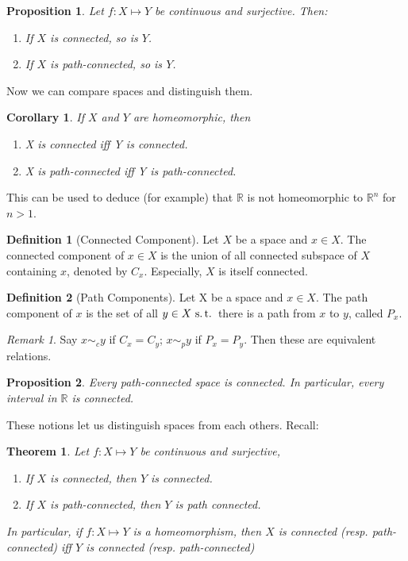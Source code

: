 \documentclass[12pt]{amsart}
\newcommand{\bbR}{\mathbb{R}}
\newcommand{\suchthat}{\operatorname{\thinspace s.t. \thinspace}}
\theoremstyle{plain}
\newtheorem*{prop}{Proposition}
\newtheorem*{thm}{Theorem}
\newtheorem*{cor}{Corollary}
\theoremstyle{remark}
\newtheorem*{rmk}{Remark}
\theoremstyle{definition}
\newtheorem*{define}{Definition}
\begin{document}
\begin{prop}
	Let $f: X \mapsto Y$ be continuous and surjective. Then:
	\begin{enumerate}[(1)]
		\item If $X$ is connected, so is $Y$.
		\item If $X$ is path-connected, so is $Y$.
	\end{enumerate}
\end{prop}

Now we can compare spaces and distinguish them.

\begin{cor}
	If $X$ and $Y$ are homeomorphic, then 
	\begin{enumerate}[(1)]
		\item X is connected iff Y is connected.
		\item X is path-connected iff Y is path-connected.
	\end{enumerate}
\end{cor}

This can be used to deduce (for example) that $\bbR$ is not homeomorphic to $\bbR^n$ for $n > 1$.

\begin{define}[Connected Component]
	Let $X$ be a space and $x \in X$. The connected component of $x \in X$ is the union of all connected subspace of $X$ containing $x$, denoted by $C_x$. Especially, $X$ is itself connected.
\end{define}

\begin{define}[Path Components]
	Let X be a space and $x \in X$. The path component of $x$ is the set of all $y\in X \suchthat$ there is a path from $x$ to $y$, called $P_x$.
\end{define}

\begin{rmk}
	Say $x {\sim}_{c} y$ if $C_x = C_y$; $x {\sim}_{p} y$ if $P_x = P_y$. Then these are equivalent relations.
\end{rmk}

\begin{prop}
	Every path-connected space is connected. In particular, every interval in $\bbR$ is connected.
\end{prop}

These notions let us distinguish spaces from each others. Recall:

\begin{thm}
	Let $f:X\mapsto Y$ be continuous and surjective, 
\begin{enumerate}[(1)]
\item If $X$ is connected, then $Y$ is connected.
\item If $X$ is path-connected, then $Y$ is path connected. 
\end{enumerate}

In particular, if $f:X\mapsto Y$ is a homeomorphism, then $X$ is connected (resp. path-connected) iff $Y$ is connected (resp. path-connected)
\end{thm}
\end{document}
